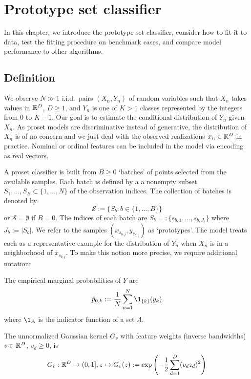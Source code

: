 \chapter{Prototype set classifier}
\label{ch_classifier}
%
In this chapter, we introduce the prototype set classifier, consider how to fit it to data, test the fitting procedure on benchmark cases, and compare model performance to other algorithms.
%
\section{Definition}
\label{sec_classifier_definition}
%
We observe $N\gg1$ i.i.d.\ pairs $(X_n,Y_n)$ of random variables such that $X_n$ takes values in $\mathbb{R}^D$, $D\geq1$, and $Y_n$ is one of $K>1$ classes represented by the integers from 0 to $K-1$.
Our goal is to estimate the conditional distribution of $Y_n$ given $X_n$.
As proset models are discriminative instead of generative, the distribution of $X_n$ is of no concern and we just deal with the observed realizations $x_n\in\mathbb{R}^D$ in practice.
Nominal or ordinal features can be included in the model via encoding as real vectors.\par
%
A proset classifier is built from $B\geq0$ `batches' of points selected from the available samples.
Each batch is defined by a a nonempty subset $S_1,\dots,S_B\subset\{1,\dots,N\}$ of the observation indices.
The collection of batches is denoted by
%
\begin{equation}
\mathcal{S}:=\{S_b:b\in\{1,\dots,B\}\}\label{eq_batches}
\end{equation}
%
or $\mathcal{S}=\emptyset$ if $B=0$.
The indices of each batch are $S_b=:\{s_{b,1},\dots,s_{b,J_b}\}$ where $J_b:=|S_b|$.
We refer to the samples $(x_{s_{b,j}},y_{s_{b,j}})$ as `prototypes'.
The model treats each as a representative example for the distribution of $Y_n$ when $X_n$ is in a neighborhood of $x_{s_{b,j}}$.
To make this notion more precise, we require additional notation:\par
%
The empirical marginal probabilities of $Y$ are
%
\begin{equation}
\hat{p}_{0,k}:=\frac{1}{N}\sum_{n=1}^N\1_{\{k\}}(y_k)\label{eq_p0k}
\end{equation}
%
where $\1_A$ is the indicator function of a set $A$.\par
%
The unnormalized Gaussian kernel $G_v$ with feature weights (inverse bandwidths) $v\in\mathbb{R}^D$, $v_d\geq0$, is
%
\begin{equation}
G_v:\mathbb{R}^D\rightarrow(0,1],
z\mapsto G_v(z):=\exp\left(-\frac{1}{2}\sum_{d=1}^D(v_dz_d)^2\right)\label{eq_kernel}
\end{equation}
